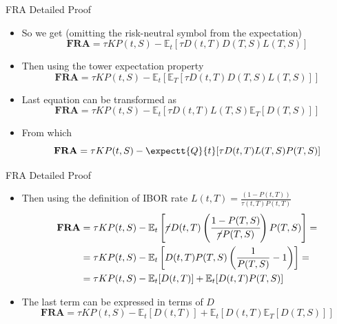 \documentclass{beamer}
\begin{document}
\begin{frame}{FRA Detailed Proof}
	\begin{itemize}
		\item<1-> So we get (omitting the risk-neutral symbol from the expectation)
		\begin{equation*}
			\textbf{FRA} = \tau KP(t,S)-\mathbb{E}_t[\tau D(t,T)D(T,S)L(T,S)]
		\end{equation*}
		\item<2-> Then using the tower expectation property
		\begin{equation*}
		\textbf{FRA} = \tau KP(t,S) - \mathbb{E}_t[\mathbb{E}_T[\tau D(t,T)D(T,S)L(T,S)]]
		\end{equation*}
		\item<3-> Last equation can be transformed as
		\begin{equation*}
			\textbf{FRA} = \tau KP(t,S) - \mathbb{E}_t[\tau D(t,T)L(T,S)\mathbb{E}_T[D(T,S)]]
		\end{equation*}
		\item<4-> From which
		\begin{equation*}
		\textbf{FRA} = \tau KP(t,S) - \expectt{Q}{t}[\tau D(t,T)L(T,S)P(T,S)]
		\end{equation*}
	\end{itemize}
\end{frame}

\begin{frame}{FRA Detailed Proof}
	\begin{itemize}
		\item<1-> Then using the definition of IBOR rate $L(t,T)=\frac{(1-P(t,T))}{\tau(t,T)P(t,T)}$
		\begin{equation*}
			\begin{aligned}
			\textbf{FRA} &= \tau KP(t,S) - \mathbb{E}_t\left[\cancel{\tau}D(t,T)\left(\cfrac{1-P(T,S)}{\cancel{\tau} P(T,S)}\right)P(T,S)\right] = \\
			&=\tau KP(t,S)-\mathbb{E}_t\left[D(t,T)P(T,S)\left(\frac{1}{P(T,S)}-1\right)\right]= \\
			&=\tau KP(t,S)-\mathbb{E}_t[D(t,T)] + \mathbb{E}_t[D(t,T)P(T,S)]
			\end{aligned}
		\end{equation*}
		\item<2-> The last term can be expressed in terms of $D$
		\begin{equation*}
			\textbf{FRA} = \tau KP(t,S)-\mathbb{E}_t[D(t,T)] + \mathbb{E}_t\left[D(t,T)\mathbb{E}_T[D(T,S)]\right]
		\end{equation*}		
	\end{itemize}
\end{frame}
\end{document}
